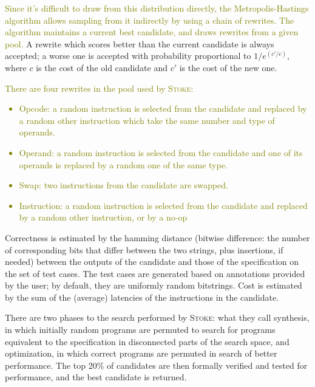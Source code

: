 \documentclass[12pt,twoside]{reedthesis}
\newcommand{\green}[1]{\textcolor{olive}{#1}}
\begin{document}
        \green{
        Since it's difficult to draw from this distribution directly, the Metropolis-Hastings algorithm \cite{metropolis1953montecarlo} \cite{hastings1970mcmc} allows sampling from it indirectly by using a chain of rewrites.
        The algorithm maintains a current best candidate, and draws rewrites from a given pool.
        }
        A rewrite which scores better than the current candidate is always accepted; a worse one is accepted with probability proportional to $1/e^{(c'/c)}$, where $c$ is the cost of the old candidate and $c'$ is the cost of the new one. 
        \green{
        There are four rewrites in the pool used by \textsc{Stoke}: 
        \begin{itemize}
            \item Opcode: a random instruction is selected from the candidate and replaced by a random other instruction which take the same number and type of operands.
            \item Operand: a random instruction is selected from the candidate and one of its operands is replaced by a random one of the same type.
            \item Swap: two instructions from the candidate are swapped.
            \item Instruction: a random instruction is selected from the candidate and replaced by a random other instruction, or by a no-op
        \end{itemize}
        }
        
        Correctness is estimated by the hamming distance (bitwise difference: the number of corresponding bits that differ between the two strings, plus insertions, if needed) between the outputs of the candidate and those of the specification on the set of test cases.
        The test cases are generated based on annotations provided by the user; by default, they are uniformly random bitstrings.
        Cost is estimated by the sum of the (average) latencies of the instructions in the candidate.
        
        There are two phases to the search performed by \textsc{Stoke}:
            what they call synthesis, in which initially random programs are permuted to search for programs equivalent to the specification in disconnected parts of the search space,
            and optimization, in which correct programs are permuted in search of better performance.
        The top 20\% of candidates are then formally verified and tested for performance, and the best candidate is returned.
        
\end{document}
